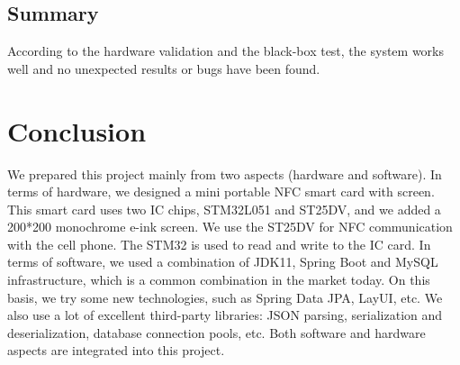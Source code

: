 \documentclass[11pt, a4paper]{article}
\begin{document}
\subsection{Summary}
According to the hardware validation and the black-box test, the system works well and no unexpected results or bugs have been found.
\begin{table}[H]
    \centering
\end{table}

\section{Conclusion}

We prepared this project mainly from two aspects (hardware and software). In terms of hardware, we designed a mini portable NFC smart card with screen. This smart card uses two IC chips, STM32L051 and ST25DV, and we added a 200*200 monochrome e-ink screen. We use the ST25DV for NFC communication with the cell phone. The STM32 is used to read and write to the IC card. In terms of software, we used a combination of JDK11, Spring Boot and MySQL infrastructure, which is a common combination in the market today. On this basis, we try some new technologies, such as Spring Data JPA, LayUI, etc. We also use a lot of excellent third-party libraries: JSON parsing, serialization and deserialization, database connection pools, etc. Both software and hardware aspects are integrated into this project.
\end{document}
